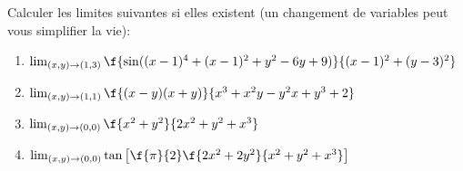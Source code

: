 
\begin{exercice}\label{exo0030}


Calculer les limites suivantes si elles existent (un changement de variables peut vous simplifier la vie):
\begin{enumerate}
\item $\lim_{(x,y)\rightarrow (1,3)}\f{\sin((x-1)^4+(x-1)^2+y^2-6y+9)}{(x-1)^2+(y-3)^2}$
\item $\lim_{(x,y)\rightarrow (1,1)}\f{(x-y)(x+y)}{x^3+x^2y-y^2x+y^3+2}$
\item $\lim_{(x,y)\rightarrow (0,0)}{\f{x^2+y^2}{2x^2+y^2+x^3}}$
\item $\lim_{(x,y)\rightarrow (0,0)}\tan{\left[\f{\pi}{2}\f{2x^2+2y^2}{x^2+y^2+x^3}\right]}$
\end{enumerate}

\end{exercice}

